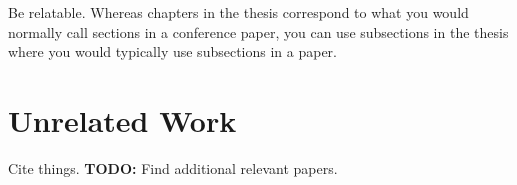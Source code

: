 Be relatable. Whereas chapters in the thesis correspond to what you would normally call sections in a conference paper, you can use subsections in the thesis where you would typically use subsections in a paper.

\section{Unrelated Work}

Cite things. \textbf{TODO:} Find additional relevant papers.
